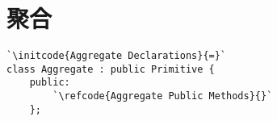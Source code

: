 \section{聚合}\label{sec:聚合}

\label{code:overview_Aggregate}
\begin{lstlisting}
`\initcode{Aggregate Declarations}{=}`
class Aggregate : public Primitive {
    public:
        `\refcode{Aggregate Public Methods}{}`
    };
\end{lstlisting}